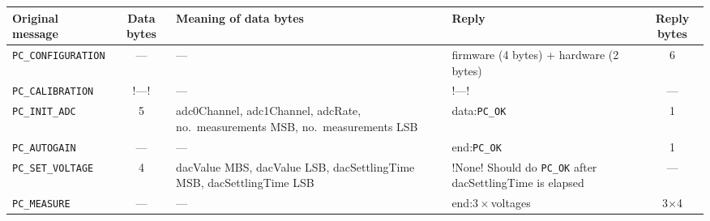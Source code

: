 \documentclass[11pt,a4paper,english]{article}
\begin{document}
\begin{center}
\begin{tabular}{lcp{}p{}c}\toprule
Original message            & Data bytes & Meaning of data bytes  & Reply & Reply bytes\\\midrule
\texttt{PC\_CONFIGURATION}  & ---        & ---								        & firmware (4 bytes) + hardware (2 bytes) & 6\\
\texttt{PC\_CALIBRATION}    & !---!      & ---                                        & !---!                     & ---\\
\texttt{PC\_INIT\_ADC}      & 5 & adc0Channel, adc1Channel, adcRate, no.\ measurements MSB, no.\ measurements LSB & data:\texttt{PC\_OK}  & 1\\
\texttt{PC\_AUTOGAIN}       & ---        & ---                                        & end:\texttt{PC\_OK}       & 1\\
\texttt{PC\_SET\_VOLTAGE}   & 4          & dacValue MBS, dacValue LSB, dacSettlingTime MSB, dacSettlingTime LSB & !None! Should do \texttt{PC\_OK} after dacSettlingTime is elapsed & ---\\
\texttt{PC\_MEASURE}        & ---        & ---                                        & end:$3\times$voltages     & 3$\times$4\\
\bottomrule
\end{tabular}
\end{center}
\end{document}
